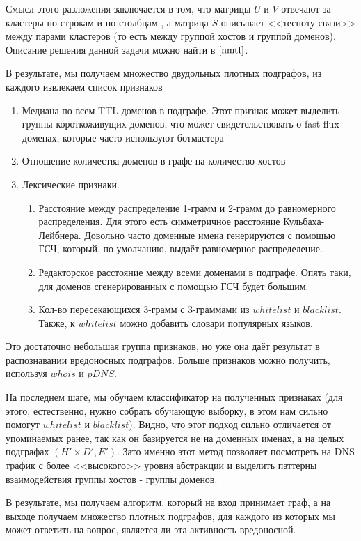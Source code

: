 \documentclass[14pt]{extreport} %
\begin{document}
Смысл этого разложения заключается в том, что матрицы $U$ и $V$ отвечают за кластеры по строкам и по столбцам , а матрица $S$ описывает <<тесноту связи>> между парами кластеров (то есть между группой хостов и группой доменов). Описание решения данной задачи можно найти в $\cite{nmtf}$.
	
В результате, мы получаем множество двудольных плотных подграфов, из каждого извлекаем список признаков
	
\begin{enumerate}
	\item Медиана по всем TTL доменов в подграфе. Этот признак может выделить группы короткоживущих доменов, что может свидетельствовать о fast-flux доменах, которые часто используют ботмастера
	\item Отношение количества доменов в графе на количество хостов
	\item Лексические признаки.
	      \begin{enumerate}
	      	\item Расстояние между распределение 1-грамм и 2-грамм до равномерного распределения. Для этого есть симметричное расстояние Кульбаха-Лейбнера. Довольно часто доменные имена генерируются с помощью ГСЧ, который, по умолчанию, выдаёт равномерное распределение.
	      	\item Редакторское расстояние между всеми доменами в подграфе. Опять таки, для доменов сгенерированных с помощью ГСЧ будет большим.
	      	\item Кол-во пересекающихся 3-грамм с 3-граммами из $whitelist$ и $blacklist$. Также, к $whitelist$ можно добавить словари популярных языков.
	      \end{enumerate}
\end{enumerate}  

Это достаточно небольшая группа признаков, но уже она даёт результат в распознавании вредоносных подграфов. Больше признаков можно получить, используя $whois$ и $pDNS$.
	
На последнем шаге, мы обучаем классификатор на полученных признаках (для этого, естественно, нужно собрать обучающую выборку, в этом нам сильно помогут $whitelist$ и $blacklist$). Видно, что этот подход сильно отличается от упоминаемых ранее, так как он базируется не на доменных именах, а на целых подграфах $(H' \times D', E')$. Зато именно этот метод позволяет посмотреть на DNS трафик с более <<высокого>> уровня абстракции и выделить паттерны взаимодействия группы хостов - группы доменов.
	
В результате, мы получаем алгоритм, который на вход принимает граф, а на выходе получаем множество плотных подграфов, для каждого из которых мы может ответить на вопрос, является ли эта активность вредоносной.
	
\end{document}
